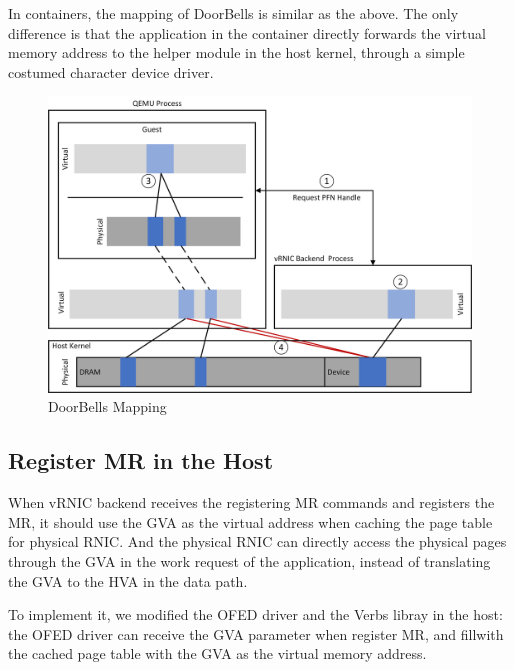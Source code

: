  In containers, the mapping of DoorBells is similar as the above. The only difference is that the application in the container directly forwards the virtual memory address to the helper module in the host kernel, through a simple costumed  character device driver. 
 \begin{figure}[!ht]
	\centering
	\includegraphics[width=1\linewidth]{images/db-map.png}
	\caption{DoorBells Mapping}
	\label{fig:db-map}
\end{figure}
 

\subsection{Register MR in the Host}
When vRNIC backend receives the registering MR commands and registers the MR, it should use the GVA as the virtual address when caching the page table for physical RNIC. And the physical RNIC can directly access the physical pages through the GVA in the work request of the application, instead of translating the GVA to the HVA in the data path. 

To implement it, we modified the OFED driver and the Verbs libray in the host: the OFED driver can receive the GVA parameter when register MR, and fillwith the cached page table with the GVA as the virtual memory address.


